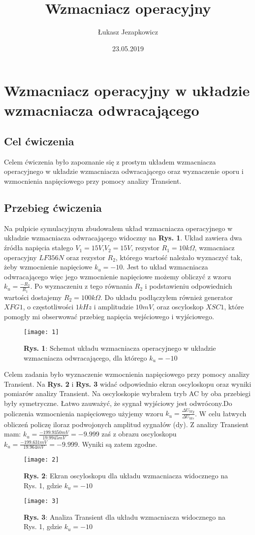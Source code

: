 \documentclass[11pt]{article}
\author{Łukasz Jezapkowicz}
\title{Wzmacniacz operacyjny}
\date{23.05.2019}
\begin{document}
\maketitle
\tableofcontents \newpage
\section{Wzmacniacz operacyjny w układzie wzmacniacza odwracającego}
\subsection{Cel ćwiczenia}
Celem ćwiczenia było zapoznanie się z prostym układem wzmacniacza operacyjnego w układzie wzmacniacza odwracającego oraz wyznaczenie oporu i wzmocnienia napięciowego przy pomocy analizy Transient.
\subsection{Przebieg ćwiczenia}
Na pulpicie symulacyjnym zbudowałem układ wzmacniacza operacyjnego w układzie wzmacniacza odwracającego widoczny na \textbf{Rys. 1}. Układ zawiera dwa źródła napięcia stałego $V_1=15V$,$V_2=15V$, rezystor $R_1=10k\Omega$, wzmacniacz operacyjny $LF356N$ oraz rezystor $R_2$, którego wartość 
należało wyznaczyć tak, żeby wzmocnienie napięciowe $k_u=-10$. Jest to układ wzmacniacza odwracającego więc jego wzmocnienie napięciowe możemy obliczyć z wzoru $k_u=\frac{-R_2}{R_1}$. Po wyznaczeniu z tego równania $R_2$ i podstawieniu odpowiednich wartości dostajemy $R_2=100k\Omega$.
Do układu podłączyłem również generator $XFG1$, o częstotliwości $1kHz$ i amplitudzie $10mV$, oraz oscyloskop $XSC1$, które pomogły mi obserwować przebieg napięcia wejściowego i wyjściowego.
\begin{figure}[H]
\centering
\texttt{[image: 1]}
\caption*{\textbf{Rys. 1}: Schemat układu wzmacniacza operacyjnego w układzie wzmacniacza odwracającego, dla którego $k_u=-10$}
\end{figure}
\noindent Celem zadania było wyznaczenie wzmocnienia napięciowego przy pomocy analizy Transient. Na \textbf{Rys. 2} i \textbf{Rys. 3} widać odpowiednio ekran oscyloskopu oraz wyniki pomiarów analizy Transient. Na oscyloskopie wybrałem tryb AC by oba przebiegi były symetryczne. Łatwo zauważyć, że sygnał wyjściowy
jest odwrócony.Do policzenia wzmocnienia napięciowego
użyjemy wzoru $k_u=\frac{{\Delta}U_{Wy}}{{\Delta}U_{We}}$. W celu łatwych obliczeń policzę iloraz podwojonych amplitud sygnałów (dy). Z analizy Transient mam: $k_u=\frac{-199.9350mV}{19.9945mV}=-9.999$ zaś z obrazu oscyloskopu $k_u=\frac{-199.631mV}{19.964mV}=-9.999$. Wyniki są zatem zgodne.
\begin{figure}[H]
\centering
\texttt{[image: 2]}
\caption*{\textbf{Rys. 2}: Ekran oscyloskopu dla układu wzmacniacza widocznego na Rys. 1, gdzie $k_u=-10$}
\end{figure}
\begin{figure}[H]
\centering
\texttt{[image: 3]}
\caption*{\textbf{Rys. 3}: Analiza Transient dla układu wzmacniacza widocznego na Rys. 1, gdzie $k_u=-10$ }
\end{figure}
\end{document}
